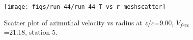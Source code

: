 \begin{figure}[H]
\centering
\texttt{[image: figs/run\_44/run\_44\_T\_vs\_r\_meshscatter]}
\caption{Scatter plot of azimuthal velocity vs radius at $z/c$=9.00, $V_{free}$=21.18, station 5.}
\label{fig:run_44_T_vs_r_meshscatter}
\end{figure}


